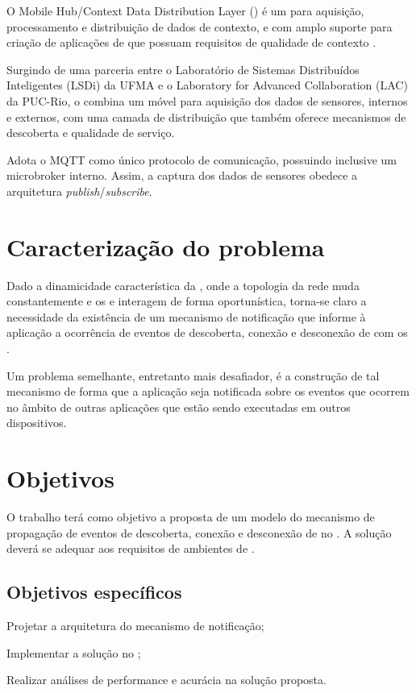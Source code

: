O Mobile Hub/Context Data Distribution Layer (\mhubcddl) é um \middleware \iot para aquisição, processamento e distribuição de dados de contexto, e com amplo suporte para criação de aplicações de \iot que possuam requisitos de qualidade de contexto \cite{Gomes_2017}.

Surgindo de uma parceria entre o Laboratório de Sistemas Distribuídos Inteligentes (LSDi) da UFMA e o Laboratory for Advanced Collaboration (LAC) da PUC-Rio, o \middleware combina um \gateway móvel para aquisição dos dados de sensores, internos e externos, com uma camada de distribuição que também oferece mecanismos de descoberta e qualidade de serviço.

Adota o MQTT como único protocolo de comunicação, possuindo inclusive um microbroker interno. Assim, a captura dos dados de sensores obedece a arquitetura \textit{publish}/\textit{subscribe}.

\section{Caracterização do problema}

Dado a dinamicidade característica da \iomt, onde a topologia da rede muda constantemente e os \smartobjs e \gateways interagem de forma oportunística, torna-se claro a necessidade da existência de um mecanismo de notificação que informe à aplicação a ocorrência de eventos de descoberta, conexão e desconexão de \smartobjs com os \smartphones.

Um problema semelhante, entretanto mais desafiador, é a construção de tal mecanismo de forma que a aplicação seja notificada sobre os eventos que ocorrem no âmbito de outras aplicações que estão sendo executadas em outros dispositivos.

\section{Objetivos}

O trabalho terá como objetivo a proposta de um modelo do mecanismo de propagação de eventos de descoberta, conexão e desconexão de \smartobjs no \middleware \mhubcddl. A solução deverá se adequar aos requisitos de ambientes de \iomt.

\subsection{Objetivos específicos}

\begin{alineas}

	\item Projetar a arquitetura do mecanismo de notificação;

	\item Implementar a solução no \middleware \mhubcddl;

	\item Realizar análises de performance e acurácia na solução proposta.

\end{alineas}



